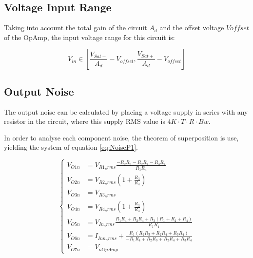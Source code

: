 \subsection{Voltage Input Range}

Taking into account the total gain of the circuit $A_d$ and the offset voltage $V{offset}$ of the OpAmp, the input voltage range for this circuit is:

\begin{equation}
   V_{in} \in \left [ \frac{V_{Sat-}}{A_d} - V_{offset}, \frac{V_{Sat+}}{A_d} - V_{offset} \right ]
\end{equation}

\subsection{Output Noise}

The output noise can be calculated by placing a voltage supply in series with any resistor in the circuit, where this supply RMS value is $4K\cdot T\cdot R\cdot Bw$.

In order to analyse each component noise, the theorem of superposition is use, yielding the system of equation \ref{eq:NoiseP1}.

\begin{equation}
    \begin{cases}
        V_{O1n} &= V_{R1_nrms} \frac{- R_{2} R_{3} - R_{2} R_{4} - R_{3} R_{4}}{R_{1} R_{4}} \\
        V_{O2n} &= V_{R2_nrms} \left(1 + \frac{R_{3}}{R_{4}}\right)  \\
        V_{O3n} &= V_{R3_nrms}\\
        V_{O4n} &= V_{R4_nrms} \left(1 + \frac{R_{3}}{R_{4}} \right)\\
        V_{O5n} &= V_{In_nrms}\frac{ R_{1} R_{4} + R_{2} R_{4} + R_{3} \left(R_{1} + R_{2} + R_{4}\right)}{R_{1} R_{4}}\\
        V_{O6n} &= I_{Inn_nrms} + \frac{R_{1} \left(R_{2} R_{3} + R_{2} R_{4} + R_{3} R_{4}\right)}{- R_{1} R_{4} + R_{2} R_{3} + R_{2} R_{4} + R_{3} R_{4}} \\
        V_{O7n} &= V_{nOpAmp}
    \end{cases}
    \label{eq:NoiseP1}
\end{equation}